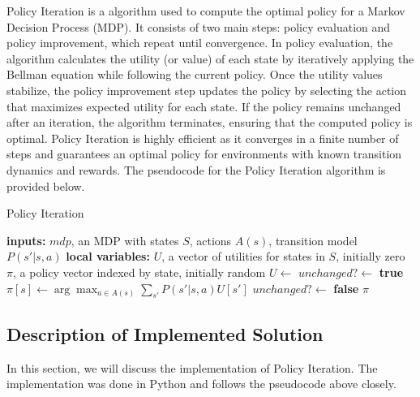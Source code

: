 Policy Iteration is a algorithm used to compute the optimal policy for a Markov Decision Process (MDP). It consists of two main steps: policy evaluation and policy improvement, which repeat until convergence. In policy evaluation, the algorithm calculates the utility (or value) of each state by iteratively applying the Bellman equation while following the current policy. Once the utility values stabilize, the policy improvement step updates the policy by selecting the action that maximizes expected utility for each state. If the policy remains unchanged after an iteration, the algorithm terminates, ensuring that the computed policy is optimal. Policy Iteration is highly efficient as it converges in a finite number of steps and guarantees an optimal policy for environments with known transition dynamics and rewards. The pseudocode for the Policy Iteration algorithm is provided below.

\vspace{10pt} %

\begin{algorithm}[H]
\caption{Policy Iteration}
\label{alg:policy_iteration}
\begin{algorithmic}[1]
    \State \textbf{inputs:} $mdp$, an MDP with states $S$, actions $A(s)$, transition model $P(s'|s, a)$
    \State \textbf{local variables:} $U$, a vector of utilities for states in $S$, initially zero
    \State \hspace{3.9cm} $\pi$, a policy vector indexed by state, initially random
    \Repeat
        \State $U \gets$ 
        \State $unchanged? \gets$ \textbf{true}
                \State $\pi[s] \gets \arg\max_{a \in A(s)} \sum_{s'} P(s'|s, a)U[s']$
                \State $unchanged? \gets$ \textbf{false}
            \EndIf
        \EndFor
    \State \Return $\pi$
\EndFunction
\end{algorithmic}
\end{algorithm}

\vspace{10pt} %

\subsection{Description of Implemented Solution}
In this section, we will discuss the implementation of Policy Iteration. The implementation was done in Python and follows the pseudocode above closely.

